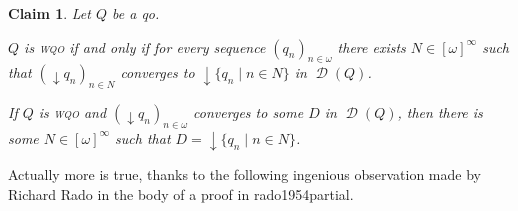 \documentclass{article}%
\newcommand\parencite{}
\theoremstyle{plain}
\newtheorem{lemma}[theorem]{Properties}
\newtheorem{lemma}[theorem]{Lemma}
\newtheorem{lemma}[theorem]{Fact}
\newtheorem{lemma}[theorem]{Facts}
\newtheorem{lemma}{Claim}
\theoremstyle{definition}
\theoremstyle{remark}
\newcommand{\wqo}{\textsc{wqo}}
\DeclareMathOperator{\dcl}{\downarrow}
\DeclareMathOperator{\Down}{\mathcal{D}} %
\newcommand{\infSub}[1]{[#1]^{\infty}}
\begin{document}
\begin{lemma}\label{fac RadoPrincipWqo}
Let $Q$ be a qo. 
\begin{enumThm}
\item $Q$ is \wqo{} if and only if for every sequence $(q_{n})_{n\in\omega}$ there exists $N\in\infSub{\omega}$ such that $(\dcl q_{n})_{n\in N}$ converges to $\dcl\{q_{n}\mid n\in N\}$ in $\Down(Q)$.
\item If $Q$ is \wqo{} and $(\dcl q_{n})_{n\in\omega}$ converges to some $D$ in $\Down(Q)$, then there is some $N\in\infSub{\omega}$ such that $D=\dcl \{q_{n}\mid n\in N\}$.
\end{enumThm}
\end{lemma}


Actually more is true, thanks to the following ingenious observation made by Richard Rado in the body of a proof in \parencite{rado1954partial}.
\end{document}
